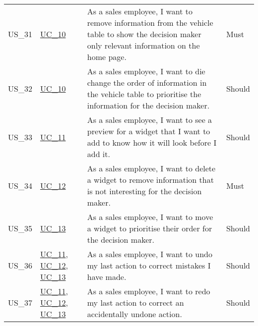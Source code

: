 \begin{footnotesize}
\begin{longtable}[L L L L]{ p{} p{} p{} p{} }
      \hypertarget{Ref:US31}{US\_31} & \hyperlink{Ref:UC10}{UC\_10} & As a sales employee, I want to remove information from the vehicle table to show the decision maker only relevant information on the home page. & Must  \\
      \hypertarget{Ref:US32}{US\_32} & \hyperlink{Ref:UC10}{UC\_10} & As a sales employee, I want to die change the order of information in the vehicle table to prioritise the information for the decision maker. & Should  \\

      \hypertarget{Ref:US33}{US\_33} & \hyperlink{Ref:UC11}{UC\_11} & As a sales employee, I want to see a preview for a widget that I want to add to know how it will look before I add it. & Should \\
      \hypertarget{Ref:US34}{US\_34} & \hyperlink{Ref:UC12}{UC\_12} & As a sales employee, I want to delete a widget to remove information that is not interesting for the decision maker. & Must \\
      \hypertarget{Ref:US35}{US\_35} & \hyperlink{Ref:UC13}{UC\_13} \  & As a sales employee, I want to move a widget to prioritise their order for the decision maker. & Should \\
      \hypertarget{Ref:US36}{US\_36} & \hyperlink{Ref:UC11}{UC\_11}, \newline \hyperlink{Ref:UC12}{UC\_12}, \newline \hyperlink{Ref:UC13}{UC\_13} & As a sales employee, I want to undo my last action to correct mistakes I have made. & Should \\
      \hypertarget{Ref:US37}{US\_37} & \hyperlink{Ref:UC11}{UC\_11}, \newline \hyperlink{Ref:UC12}{UC\_12}, \newline \hyperlink{Ref:UC13}{UC\_13} & As a sales employee, I want to redo my last action to correct an accidentally undone action. & Should \\
      \bottomrule
    \end{longtable}
  \end{footnotesize}
  \rmfamily

